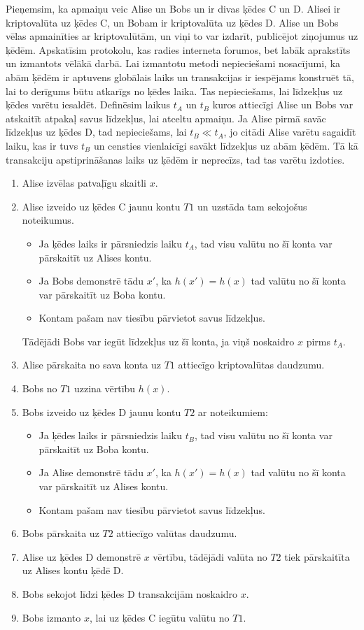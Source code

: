 Pieņemsim, ka apmaiņu veic Alise un Bobs un ir divas ķēdes C un D. Alisei ir kriptovalūta uz ķēdes C, un Bobam ir kriptovalūta uz ķēdes D. Alise un Bobs vēlas apmainīties ar kriptovalūtām, un viņi to var izdarīt, publicējot ziņojumus uz ķēdēm. Apskatīsim protokolu, kas radies interneta forumos\cite{nolan13}, bet labāk aprakstīts un izmantots vēlākā darbā.\cite{back14} Lai izmantotu metodi nepieciešami nosacījumi, ka abām ķēdēm ir aptuvens globālais laiks un transakcijas ir iespējams konstruēt tā, lai to derīgums būtu atkarīgs no ķēdes laika. Tas nepieciešams, lai līdzekļus uz ķēdes varētu iesaldēt.
Definēsim laikus $t_A$ un $t_B$ kuros attiecīgi Alise un Bobs var atskaitīt atpakaļ savus līdzekļus, lai atceltu apmaiņu. Ja Alise pirmā savāc līdzekļus uz ķēdes D, tad nepieciešams, lai $t_B \ll t_A$, jo citādi Alise varētu sagaidīt laiku, kas ir tuvs $t_B$ un censties vienlaicīgi savākt līdzekļus uz abām ķēdēm. Tā kā transakciju apstiprināšanas laiks uz ķēdēm ir neprecīzs, tad tas varētu izdoties.
\begin{enumerate}
    \item Alise izvēlas patvaļīgu skaitli $x$.
    \item Alise izveido uz ķēdes C jaunu kontu $T1$ un uzstāda tam sekojošus noteikumus.
        \begin{itemize}
            \item Ja ķēdes laiks ir pārsniedzis laiku $t_A$, tad visu valūtu no šī konta var pārskaitīt uz Alises kontu.
            \item Ja Bobs demonstrē tādu $x'$, ka $h(x') = h(x)$ tad valūtu no šī konta var pārskaitīt uz Boba kontu.
            \item Kontam pašam nav tiesību pārvietot savus līdzekļus.
        \end{itemize}
        Tādējādi Bobs var iegūt līdzekļus uz šī konta, ja viņš noskaidro $x$ pirms $t_A$.
    \item Alise pārskaita no sava konta uz $T1$ attiecīgo kriptovalūtas daudzumu.
    \item Bobs no $T1$ uzzina vērtību $h(x)$.
    \item Bobs izveido uz ķēdes D jaunu kontu $T2$ ar noteikumiem:
        \begin{itemize}
            \item Ja ķēdes laiks ir pārsniedzis laiku $t_B$, tad visu valūtu no šī konta var pārskaitīt uz Boba kontu.
            \item Ja Alise demonstrē tādu $x'$, ka $h(x') = h(x)$ tad valūtu no šī konta var pārskaitīt uz Alises kontu.
            \item Kontam pašam nav tiesību pārvietot savus līdzekļus.
        \end{itemize}
    \item Bobs pārskaita uz $T2$ attiecīgo valūtas daudzumu.
    \item Alise uz ķēdes D demonstrē $x$ vērtību, tādējādi valūta no $T2$ tiek pārskaitīta uz Alises kontu ķēdē D.
    \item Bobs sekojot līdzi ķēdes D transakcijām noskaidro $x$.
    \item Bobs izmanto $x$, lai uz ķēdes C iegūtu valūtu no $T1$.
\end{enumerate}
